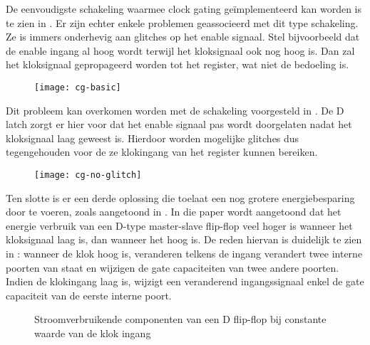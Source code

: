 De eenvoudigste schakeling waarmee clock gating ge\"implementeerd kan worden is te zien in . Er zijn echter enkele problemen geassocieerd met dit type schakeling. Ze is immers onderhevig aan glitches op het enable signaal. Stel bijvoorbeeld dat de enable ingang al hoog wordt terwijl het kloksignaal ook nog hoog is. Dan zal het kloksignaal gepropageerd worden tot het register, wat niet de bedoeling is.

\begin{figure}[h]
	\centering
		\texttt{[image: cg-basic]}
		\label{figuur-implementatie-optimalisatie-cg-basic}
\end{figure}

Dit probleem kan overkomen worden met de schakeling voorgesteld in . De D latch zorgt er hier voor dat het enable signaal pas wordt doorgelaten nadat het kloksignaal laag geweest is. Hierdoor worden mogelijke glitches dus tegengehouden voor de ze klokingang van het register kunnen bereiken.

\begin{figure}[h]
	\centering
		\texttt{[image: cg-no-glitch]}
		\label{figuur-implementatie-optimalisatie-cg-no-glitch}
\end{figure}

Ten slotte is er een derde oplossing die toelaat een nog grotere energiebesparing door te voeren, zoals aangetoond in \cite{mueller}. In die paper wordt aangetoond dat het energie verbruik van een D-type master-slave flip-flop veel hoger is wanneer het kloksignaal laag is, dan wanneer het hoog is. De reden hiervan is duidelijk te zien in : wanneer de klok hoog is, veranderen telkens de ingang verandert twee interne poorten van staat en wijzigen de gate capaciteiten van twee andere poorten. Indien de klokingang laag is, wijzigt een veranderend ingangssignaal enkel de gate capaciteit van de eerste interne poort.

\begin{figure}[h]
	\centering
		\label{figuur-implementatie-optimalisatie-cg-power-dis}
		\caption[Stroomverbruikende componenten van een D flip-flop bij constante waarde van de klok ingang \cite{mueller}]{Stroomverbruikende componenten van een D flip-flop bij constante waarde van de klok ingang \cite{mueller}}
\end{figure}


